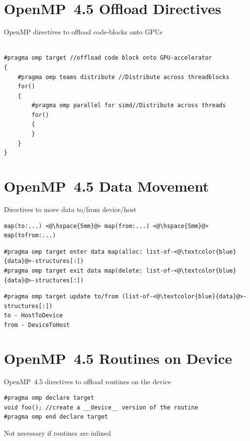 \documentclass[xcolor=dvipsnames,compress,10pt]{nersc}
\begin{document}
\section{OpenMP~4.5 Offload Directives}
\begin{frame}[fragile]{OpenMP directives to offload code-blocks onto GPUs}
\begin{lstlisting}[style=cleanText]

#pragma omp target //offload code block onto GPU-accelerator
{
    #pragma omp teams distribute //Distribute across threadblocks
    for()
    {
        #pragma omp parallel for simd//Distribute across threads
        for()
        {
        }
    }
}

\end{lstlisting}
\end{frame}

\section{OpenMP~4.5 Data Movement}
\begin{frame}[fragile]{Directives to move data to/from device/host}
%
\begin{lstlisting}[style=cleanText]
map(to:...) <@\hspace{5mm}@> map(from:...) <@\hspace{5mm}@> map(tofrom:...)
\end{lstlisting}
%
\begin{lstlisting}[style=cleanText]
#pragma omp target enter data map(alloc: list-of-<@\textcolor{blue}{data}@>-structures[:])
#pragma omp target exit data map(delete: list-of-<@\textcolor{blue}{data}@>-structures[:])
\end{lstlisting}
%
\begin{lstlisting}[style=cleanText]
#pragma omp target update to/from (list-of-<@\textcolor{blue}{data}@>-structures[:])
to - HostToDevice
from - DeviceToHost
\end{lstlisting}
\end{frame}

\section{OpenMP~4.5 Routines on Device}
\begin{frame}[fragile]{OpenMP~4.5 directives to offload routines on the device}
\begin{lstlisting}[style=cleanText]
#pragma omp declare target
void foo(); //create a __device__ version of the routine
#pragma omp end declare target
\end{lstlisting}
 Not necessary if routines are inlined
\end{frame}
\end{document}
